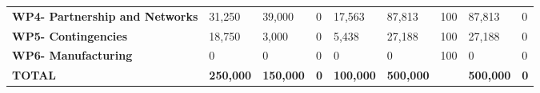 \begin{table}[H]
{\begin{tabular}{p{5cm}p{2cm}p{2cm}p{2.5cm}p{2cm}p{2cm}p{2cm}p{2cm}p{2cm}}
\textbf{WP4- Partnership and Networks} & 31,250                                                                 & 39,000                                                             &0                                                                                 & 17,563                                                                       & 87,813                                                                                        & 100                        & 87,813                          & 0                                                                         \\
\textbf{WP5- Contingencies}                                                        & 18,750                                                                 & 3,000                                                              &0                                                                                 & 5,438                                                                        & 27,188                                                                                        & 100                        & 27,188                          & 0                                                                         \\
\textbf{WP6- Manufacturing}                                                        & 0                                                                      & 0                                                                  &0                                                                                 & 0                                                                            & 0                                                                                             & 100                        & 0                               & 0                                                                         \\ \hline
\textbf{TOTAL}                                                                     & \textbf{250,000}                                                       & \textbf{150,000}                                                   & \textbf{0}                                                                      & \textbf{100,000}                                                             & \textbf{500,000}                                                                              & \textbf{}                    & \textbf{500,000}                & \textbf{0}                                                               
\\ \bottomrule[2pt]
\end{tabular} }
\end{table}


